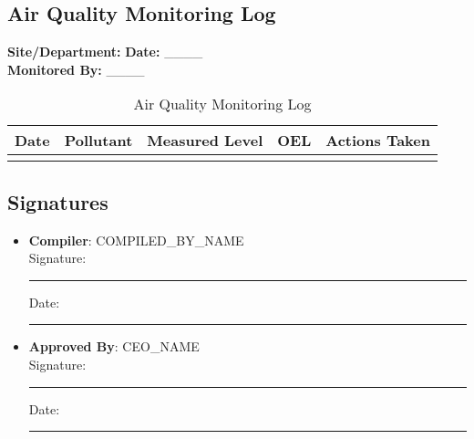 \documentclass[11pt]{article}
\newcommand{\location}{}
\newcommand{\compilerName}{{{COMPILED_BY_NAME}}}
\begin{document}
\subsection*{Air Quality Monitoring Log}

\textbf{Site/Department:} \location \textbf{Date:} \_\_\_\_ \\
\textbf{Monitored By:} \_\_\_\_

\begin{table}[h]
    \centering
    \begin{tabular}{p{2cm}p{2cm}p{2cm}p{2cm}p{3cm}}
        \toprule
        \textbf{Date} & \textbf{Pollutant} & \textbf{Measured Level} & \textbf{OEL} & \textbf{Actions Taken} \\
        \midrule
        & & & & \\
        \bottomrule
    \end{tabular}
    \caption{Air Quality Monitoring Log}
\end{table}

\subsection*{Signatures}
\begin{itemize}
  \item \textbf{Compiler}: \compilerName \\
    Signature: \rule{5cm}{0.4pt} \quad Date: \rule{3cm}{0.4pt}
  \item \textbf{Approved By}: {{CEO_NAME}} \\
    Signature: \rule{5cm}{0.4pt} \quad Date: \rule{3cm}{0.4pt}
\end{itemize}
\end{document}
